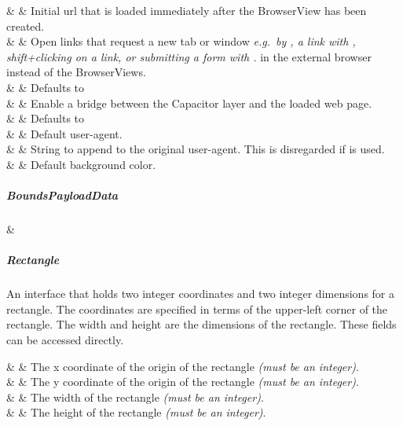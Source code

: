 \begin{interfacedesc}
                    &    & Initial \ac{url} that is loaded immediately after the BrowserView has been created. \\ \hline
   &   & Open links that request a new tab or window \textit{e.g.\ by , a link with , shift+clicking on a link, or submitting a form with .} in the external browser instead of the BrowserViews. \\
                              &                             & Defaults to  \\ \hline
           &   & Enable a bridge between the Capacitor layer and the loaded web page. \\
                              &                             & Defaults to  \\ \hline
      &    & Default user-agent. \\ \hline
        &    & String to append to the original user-agent. This is disregarded if  is used. \\ \hline
        &     & Default background color. \\ \hline
\end{interfacedesc}

\subparagraph{BoundsPayloadData}

\begin{interface}
   &  \\ \hline
\end{interface}

\newpage

\subparagraph{Rectangle}

An interface that holds two integer coordinates and two integer dimensions for a rectangle.
The coordinates are specified in terms of the upper-left corner of the rectangle.
The width and height are the dimensions of the rectangle.
These fields can be accessed directly.

\begin{interfacedesc}
        &  & The x coordinate of the origin of the rectangle \textit{(must be an integer)}. \\ \hline
        &  & The y coordinate of the origin of the rectangle \textit{(must be an integer)}. \\ \hline
    &  & The width of the rectangle \textit{(must be an integer)}. \\ \hline
   &  & The height of the rectangle \textit{(must be an integer)}. \\ \hline
\end{interfacedesc}

